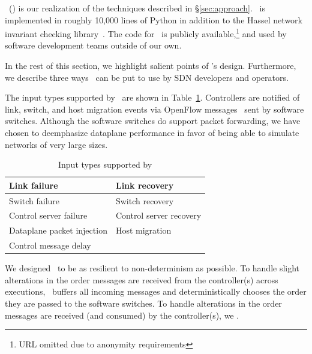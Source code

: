 \projectname~(\projectmeaning) is our realization of the techniques described in
\S\ref{sec:approach}. \projectname~is implemented in roughly 10,000 lines of Python in
addition to the Hassel network invariant checking library~\cite{hsa}. The code
for \projectname~is publicly available,\footnote{URL omitted due to anonymity requirements}
and used by  software development teams outside of our own.

In the rest of this section, we highlight salient points of \projectname's
design. Furthermore, we describe three ways \projectname~can be put to use
by SDN developers and operators.

The input types supported by \projectname~are shown in Table~\ref{tab:inputs}.
Controllers are notified of link, switch, and host migration events
via OpenFlow messages~\cite{openflow} sent by software switches.
Although the software switches do support packet forwarding, we
have chosen to deemphasize dataplane performance in favor of
being able to simulate networks of very large sizes. %

\begin{table}
\centering
\begin{tabular}{|l|l|}
\hline
Link failure & Link recovery \\
\hline
Switch failure & Switch recovery \\
\hline
Control server failure & Control server recovery \\
\hline
Dataplane packet injection & Host migration \\
\hline
Control message delay & \\
\hline
\end{tabular}
\caption{Input types supported by \projectname}
\label{tab:inputs}
\end{table}

We designed \projectname~to be as resilient to non-determinism as possible.
To handle slight alterations in the order messages are received from the
controller(s) across executions, \projectname~buffers all incoming messages and
deterministically chooses the order they are
passed to the software switches. To handle alterations in the order messages
are received (and consumed) by the controller(s), we .

